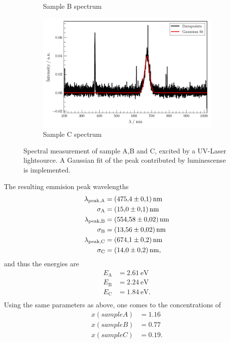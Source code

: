\begin{figure}
\begin{subfigure}{.3\textwidth}
    \caption{Sample B spectrum}
\end{subfigure}
\begin{subfigure}{.3\textwidth}
    \centering
    \includegraphics[width=\textwidth]{plots/Samp_C_D_UV.pdf}
  \caption{Sample C spectrum}
\end{subfigure}
\caption{Spectral measurement of sample A,B and C, excited by a UV-Laser lightsource. A Gaussian fit of the peak contributed by luminescense is implemented.}
\end{figure}\label{fig:UV-sample-spectra}

The resulting emmision peak wavelengths 
\begin{align*}
    \lambda_\text{peak,A} &= \SI{475.4 \pm 0.1}{\nano\meter} \\
    \sigma_\text{A} &= \SI{15.0 \pm 0.1}{\nano\meter} \\
    \lambda_\text{peak,B} &= \SI{554.58 \pm 0.02}{\nano\meter} \\
    \sigma_\text{B} &= \SI{13.56 \pm 0.02}{\nano\meter} \\
    \lambda_\text{peak,C} &= \SI{674.1 \pm 0.2}{\nano\meter} \\
    \sigma_\text{C} &= \SI{14.0 \pm 0.2}{\nano\meter}, \\
\end{align*}
and thus the energies are
\begin{align*}
    E_\text{A} &= \SI{2.61}{\eV} \\
    E_\text{B} &= \SI{2.24}{\eV} \\
    E_\text{C} &= \SI{1.84}{\eV}. \\
\end{align*}
Using the same parameters as above, one comes to the concentrations of
\begin{align*}
    x(sample A) &= \num{1.16}\\
    x(sample B) &= \num{0.77}\\
    x(sample C) &= \num{0.19}.\\
\end{align*}


